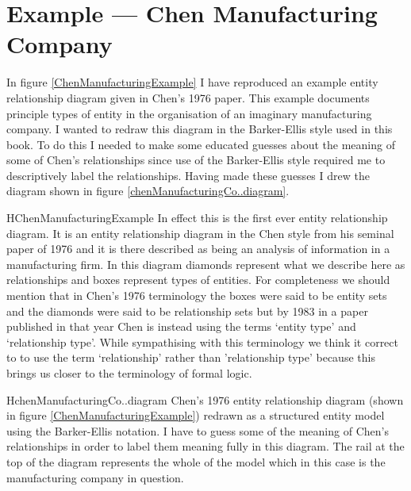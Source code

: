 \section{Example --- Chen Manufacturing Company}
\label{ChenManufacturingCompany}
In figure \ref{ChenManufacturingExample} I have reproduced an example entity relationship diagram  given in Chen's 1976 paper. This example documents principle types of entity in the organisation of an imaginary manufacturing company.  I wanted to redraw
this diagram in the Barker-Ellis style used in this book. To do this I needed to make some educated guesses about the meaning of some of Chen's relationships since use of the Barker-Ellis style  required me to descriptively label the relationships. Having made these guesses I drew the diagram shown
 in figure \ref{chenManufacturingCo..diagram}. 

\begin{erboxedFigure} {H}{ChenManufacturingExample}{
In effect this is the first ever entity relationship diagram. It is an entity relationship diagram in the Chen style from his seminal paper of 1976 and it is there described as being an analysis of information in a manufacturing firm. In this diagram
diamonds represent what we describe here as relationships and boxes represent types of entities.  
For completeness we should mention that in Chen's 1976 terminology the boxes were said to be entity sets and the diamonds were said to be relationship sets but by 1983 in a paper published in that year Chen is instead using the terms `entity type' and `relationship type'. While sympathising with this terminology we think it correct to to use the term `relationship' rather than 'relationship type' because this brings us closer to the terminology of formal logic.
}
\begin{center}
\scalebox{0.80}{}
\end{center}
\end{erboxedFigure}

\begin{erboxedFigure} {H}{chenManufacturingCo..diagram}{
Chen's 1976 entity relationship diagram (shown in figure \ref{ChenManufacturingExample}) 
redrawn as a structured entity model using the Barker-Ellis notation. 
I have to guess some of the meaning of Chen's relationships in order to label them meaning fully in
 this diagram. 
 The rail at the top of the diagram represents the whole of the model which in this case is the manufacturing company in question.
}
\begin{center}
\scalebox{0.95}{}
\end{center}
\end{erboxedFigure}
\newpage
